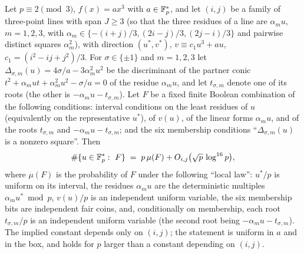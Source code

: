 
\begin{lemma}\label{lem:fe}
Let $p\equiv2\pmod3$, $f(x)=ax^3$ with $a\in\mathbb{F}_p^*$, and let $(i,j)$ be a family of three-point lines with span $J\ge3$ (so that the three residues of a
line are $\alpha_mu$, $m=1,2,3$, with $\alpha_m\in\{-(i+j)/3,(2i-j)/3,(2j-i)/3\}$ and pairwise distinct squares $\alpha_m^2$), with direction
$(u^*,v^*)$, $v\equiv c_1u^3+au$, $c_1=(i^2-ij+j^2)/3$.  For $\sigma\in\{\pm1\}$ and $m=1,2,3$ let $\Delta_{\sigma,m}(u)=4\sigma/a-3\alpha_m^2u^2$ be the
discriminant of the partner conic $t^2+\alpha_mut+\alpha_m^2u^2-\sigma/a=0$ of the residue $\alpha_mu$, and let $t_{\sigma,m}$ denote one of its roots
(the other is $-\alpha_mu-t_{\sigma,m}$).  Let $F$ be a fixed finite Boolean combination of the following conditions: interval conditions on the least
residues of $u$ (equivalently on the representative $u^*$), of $v(u)$, of the linear forms $\alpha_mu$, and of the roots $t_{\sigma,m}$ and
$-\alpha_mu-t_{\sigma,m}$; and the six membership conditions ``$\Delta_{\sigma,m}(u)$ is a nonzero square''.  Then
\[
 \#\{u\in\Fp^*:\ F\}\;=\;p\,\mu(F)+O_{i,j}\bigl(\sqrt p\,\log^{16}p\bigr),
\]
where $\mu(F)$ is the probability of $F$ under the following ``local law'': $u^*/p$ is uniform on its interval, the residues $\alpha_mu$ are the
deterministic multiples $\alpha_mu^*\bmod p$, $v(u)/p$ is an independent uniform variable, the six membership bits are independent fair coins, and,
conditionally on membership, each root $t_{\sigma,m}/p$ is an independent uniform variable (the second root being $-\alpha_mu-t_{\sigma,m}$).  The implied
constant depends only on $(i,j)$; the statement is uniform in $a$ and in the box, and holds for $p$ larger than a constant depending on $(i,j)$.
\end{lemma}
